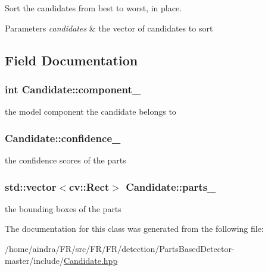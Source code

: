 \-Sort the candidates from best to worst, in place. 


\begin{DoxyParams}{\-Parameters}
{\em candidates} & the vector of candidates to sort \\
\hline
\end{DoxyParams}


\subsection{\-Field \-Documentation}
\hypertarget{classCandidate_a7866513384d74055891a237a524798ab}{
\subsubsection[{component\-\_\-}]{\setlength{\rightskip}{0pt plus 5cm}int {\bf \-Candidate\-::component\-\_\-}}}\label{classCandidate_a7866513384d74055891a237a524798ab}


the model component the candidate belongs to 

\hypertarget{classCandidate_a31785654c1d01cda9cadf93e919b30f1}{
\subsubsection[{confidence\-\_\-}]{ {\bf \-Candidate\-::confidence\-\_\-}}}\label{classCandidate_a31785654c1d01cda9cadf93e919b30f1}


the confidence scores of the parts 

\hypertarget{classCandidate_aa0e3d40adf86bff2e99f3e4234ce674b}{
\subsubsection[{parts\-\_\-}]{\setlength{\rightskip}{0pt plus 5cm}std\-::vector$<$cv\-::\-Rect$>$ {\bf \-Candidate\-::parts\-\_\-}}}\label{classCandidate_aa0e3d40adf86bff2e99f3e4234ce674b}


the bounding boxes of the parts 



\-The documentation for this class was generated from the following file\-:\begin{DoxyCompactItemize}
\item 
/home/aindra/\-F\-R/src/\-F\-R/\-F\-R/detection/\-Parts\-Based\-Detector-\/master/include/\hyperlink{Candidate_8hpp}{\-Candidate.\-hpp}\end{DoxyCompactItemize}

